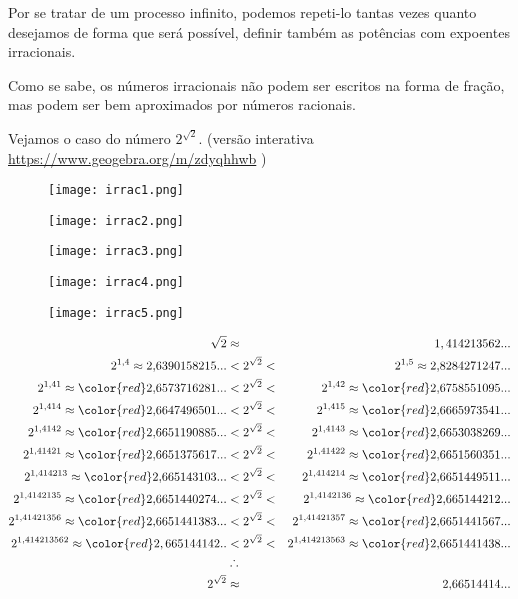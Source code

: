 Por se tratar de um processo infinito, podemos repeti-lo tantas vezes quanto desejamos de forma que será possível, definir também as potências com expoentes irracionais.

Como se sabe, os números irracionais não podem ser escritos na forma de fração, mas podem ser bem aproximados por números racionais.

Vejamos o caso do número $2^{\sqrt{2}}$. (versão interativa \url{https://www.geogebra.org/m/zdyqhhwb} )

\begin{figure}[H]
\centering
\texttt{[image: irrac1.png]}
\end{figure}

\begin{figure}[H]
\centering
\texttt{[image: irrac2.png]}
\end{figure}

\begin{figure}[H]
\centering
\texttt{[image: irrac3.png]}
\end{figure}

\begin{figure}[H]
\centering
\texttt{[image: irrac4.png]}
\end{figure}

\begin{figure}[H]
\centering
\texttt{[image: irrac5.png]}
\end{figure}

\begin{eqnarray*}
{\sqrt{2}}&\approx& 1,414213562...\\
2^{1{,}4}\approx 2{,}6390158215...& <2^{\sqrt{2}} < & 2^{1{,}5}\approx 2{,}8284271247...\\
2^{1{,}41}\approx {\color{red} 2{,}6}573716281... & < 2^{\sqrt{2}} < & 2^{1{,}42}\approx {\color{red} 2{,}6}758551095...\\
2^{1{,}414}\approx {\color{red} 2{,}66}47496501...&<2^{\sqrt{2}} < & 2^{1{,}415}\approx {\color{red} 2{,}66}65973541...\\
2^{1{,}4142}\approx {\color{red} 2{,}665}1190885...&<2^{\sqrt{2}} <& 2^{1{,}4143}\approx {\color{red} 2{,}665}3038269...\\
2^{1{,}41421}\approx {\color{red} 2{,}6651}375617...&<2^{\sqrt{2}} <& 2^{1{,}41422}\approx {\color{red} 2{,}6651}560351...\\
2^{1{,}414213}\approx {\color{red} 2{,}66514}3103...&<2^{\sqrt{2}} <& 2^{1{,}414214}\approx {\color{red} 2{,}66514}49511...\\
2^{1{,}4142135}\approx {\color{red} 2{,}665144}0274...&<2^{\sqrt{2}} <& 2^{1{,}4142136}\approx {\color{red} 2{,}665144}212...\\
2^{1{,}41421356}\approx {\color{red} 2{,}6651441}383... &<2^{\sqrt{2}} <& 2^{1{,}41421357}\approx {\color{red} 2{,}6651441}567... \\
2^{1{,}414213562}\approx {\color{red} 2,66514414}2.. &<2^{\sqrt{2}} <& 2^{1{,}414213563}\approx {\color{red} 2{,}66514414}38...\\
&\therefore& \\
2^{\sqrt{2}}&\approx& 2{,}66514414...\\
\end{eqnarray*}

